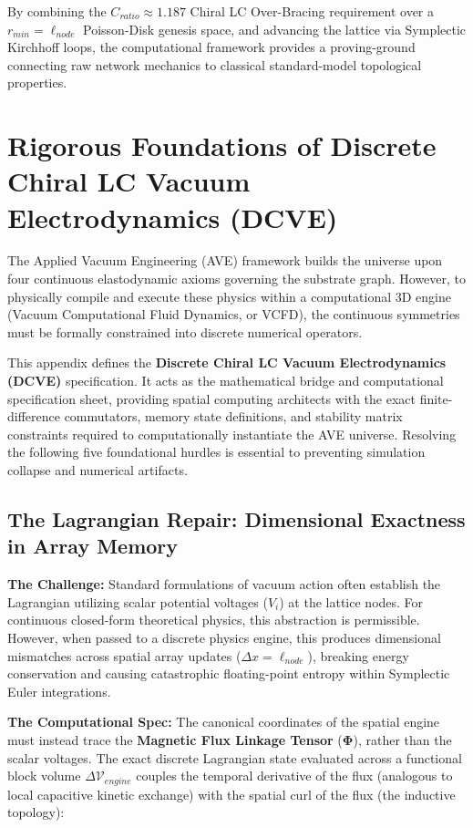 By combining the $C_{ratio} \approx 1.187$ Chiral LC Over-Bracing requirement over a $r_{min} = \ell_{node}$ Poisson-Disk genesis space, and advancing the lattice via Symplectic Kirchhoff loops, the computational framework provides a proving-ground connecting raw network mechanics to classical standard-model topological properties.

\chapter{Rigorous Foundations of Discrete Chiral LC Vacuum Electrodynamics (DCVE)}
\label{app:dcve}

The Applied Vacuum Engineering (AVE) framework builds the universe upon four continuous elastodynamic axioms governing the substrate graph. However, to physically compile and execute these physics within a computational 3D engine (Vacuum Computational Fluid Dynamics, or VCFD), the continuous symmetries must be formally constrained into discrete numerical operators. 

This appendix defines the \textbf{Discrete Chiral LC Vacuum Electrodynamics (DCVE)} specification. It acts as the mathematical bridge and computational specification sheet, providing spatial computing architects with the exact finite-difference commutators, memory state definitions, and stability matrix constraints required to computationally instantiate the AVE universe. Resolving the following five foundational hurdles is essential to preventing simulation collapse and numerical artifacts.

\section{The Lagrangian Repair: Dimensional Exactness in Array Memory}

\textbf{The Challenge:} Standard formulations of vacuum action often establish the Lagrangian utilizing scalar potential voltages ($V_i$) at the lattice nodes. For continuous closed-form theoretical physics, this abstraction is permissible. However, when passed to a discrete physics engine, this produces dimensional mismatches across spatial array updates ($\Delta x = \ell_{node}$), breaking energy conservation and causing catastrophic floating-point entropy within Symplectic Euler integrations.

\textbf{The Computational Spec:} The canonical coordinates of the spatial engine must instead trace the \textbf{Magnetic Flux Linkage Tensor} ($\mathbf{\Phi}$), rather than the scalar voltages. The exact discrete Lagrangian state evaluated across a functional block volume $\Delta \mathcal{V}_{engine}$ couples the temporal derivative of the flux (analogous to local capacitive kinetic exchange) with the spatial curl of the flux (the inductive topology):

